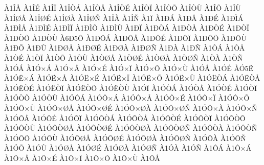 {^^c01^^ce^^c5
^^c01^^ce^^c9
^^c01^^ce^^cf
^^c01^^ce^^d2^^c1
^^c01^^ce^^d2^^c5
^^c01^^ce^^d2^^c9
^^c01^^ce^^d2^^cf
^^c01^^ce^^d2^^d5
^^c01^^ce^^d2^^d9
^^c01^^ce^^d5
^^c01^^ce^^d9
^^c01^^ce^^d8^^c5
^^c01^^ce^^d8^^c9
^^c01^^ce^^d8^^c0
^^c01^^ce^^d8^^d1
^^c01^^ce^^c0
^^c01^^ce^^d1
^^c01^^cf
^^c01^^d0^^c1
^^c01^^d0^^c5
^^c01^^d0^^c9
^^c01^^d0^^cc^^c1
^^c01^^d0^^cc^^c5
^^c01^^d0^^cc^^c9
^^c01^^d0^^cc^^cf
^^c01^^d0^^cc^^d5
^^c01^^d0^^cc^^d9
^^c01^^d0^^cf
^^c01^^d0^^d2^^c1
^^c01^^d0^^d2^^c5
^^c01^^d0^^d2^^c9
^^c01^^d0^^d2^^cf
^^c01^^d0^^d2^^d5
^^c01^^d0^^d2^^d9
^^c06^^d05^^d4
^^c01^^d0^^d4^^c1
^^c01^^d0^^d4^^c5
^^c01^^d0^^d4^^c9
^^c01^^d0^^d4^^cf
^^c01^^d0^^d4^^d5
^^c01^^d0^^d4^^d9
^^c01^^d0^^d5
^^c01^^d0^^d9
^^c01^^d0^^d8^^c5
^^c01^^d0^^d8^^c9
^^c01^^d0^^d8^^c0
^^c01^^d0^^d8^^d1
^^c01^^d0^^c0
^^c01^^d0^^d1
^^c01^^d2^^c1
^^c01^^d2^^c5
^^c01^^d2^^c9
^^c01^^d2^^cf
^^c01^^d2^^d5
^^c01^^d2^^d9
^^c01^^d2^^d8^^c5
^^c01^^d2^^d8^^c9
^^c01^^d2^^d8^^c0
^^c01^^d2^^d8^^d1
^^c01^^d2^^c0
^^c01^^d2^^d1
^^c01^^d3^^c1
^^c01^^d3^^d7^^c1
^^c01^^d3^^d7^^c5
^^c01^^d3^^d7^^c9
^^c01^^d3^^d7^^cf
^^c01^^d3^^d7^^d5
^^c01^^d3^^d7^^d9
^^c01^^d3^^c5
^^c01^^d3^^c9
^^c0^^d35^^cb
^^c01^^d3^^cb^^d7^^c1
^^c01^^d3^^cb^^d7^^c5
^^c01^^d3^^cb^^d7^^c9
^^c01^^d3^^cb^^d7^^cf
^^c01^^d3^^cb^^d7^^d5
^^c01^^d3^^cb^^d7^^d9
^^c01^^d3^^cb^^d2^^c1
^^c01^^d3^^cb^^d2^^c5
^^c01^^d3^^cb^^d2^^c9
^^c01^^d3^^cb^^d2^^cf
^^c01^^d3^^cb^^d2^^d5
^^c01^^d3^^cb^^d2^^d9
^^c01^^d3^^cf
^^c01^^d3^^d2^^c1
^^c01^^d3^^d2^^c5
^^c01^^d3^^d2^^c9
^^c01^^d3^^d2^^cf
^^c01^^d3^^d2^^d5
^^c01^^d3^^d2^^d9
^^c01^^d3^^d4^^c1
^^c01^^d3^^d4^^d7^^c1
^^c01^^d3^^d4^^d7^^c5
^^c01^^d3^^d4^^d7^^c9
^^c01^^d3^^d4^^d7^^cf
^^c01^^d3^^d4^^d7^^d5
^^c01^^d3^^d4^^d7^^d9
^^c01^^d3^^d4^^d7^^d8^^c5
^^c01^^d3^^d4^^d7^^d8^^c9
^^c01^^d3^^d4^^d7^^d8^^c0
^^c01^^d3^^d4^^d7^^d8^^d1
^^c01^^d3^^d4^^d7^^c0
^^c01^^d3^^d4^^d7^^d1
^^c01^^d3^^d4^^c5
^^c01^^d3^^d4^^c9
^^c01^^d3^^d4^^cf
^^c01^^d3^^d4^^d2^^c1
^^c01^^d3^^d4^^d2^^c5
^^c01^^d3^^d4^^d2^^c9
^^c01^^d3^^d4^^d2^^cf
^^c01^^d3^^d4^^d2^^d5
^^c01^^d3^^d4^^d2^^d9
^^c01^^d3^^d4^^d2^^d8^^c5
^^c01^^d3^^d4^^d2^^d8^^c9
^^c01^^d3^^d4^^d2^^d8^^c0
^^c01^^d3^^d4^^d2^^d8^^d1
^^c01^^d3^^d4^^d2^^c0
^^c01^^d3^^d4^^d2^^d1
^^c01^^d3^^d4^^d5
^^c01^^d3^^d4^^d9
^^c01^^d3^^d4^^d8^^c5
^^c01^^d3^^d4^^d8^^c9
^^c01^^d3^^d4^^d8^^c0
^^c01^^d3^^d4^^d8^^d1
^^c01^^d3^^d4^^c0
^^c01^^d3^^d4^^d1
^^c01^^d3^^d5
^^c01^^d3^^d9
^^c01^^d3^^d8^^c5
^^c01^^d3^^d8^^c9
^^c01^^d3^^d8^^c0
^^c01^^d3^^d8^^d1
^^c01^^d3^^c0
^^c01^^d3^^d1
^^c01^^d4^^c1
^^c01^^d4^^d7^^c1
^^c01^^d4^^d7^^c5
^^c01^^d4^^d7^^c9
^^c01^^d4^^d7^^cf
^^c01^^d4^^d7^^d5
^^c01^^d4^^d7^^d9
^^c01^^d4^^c5
}
